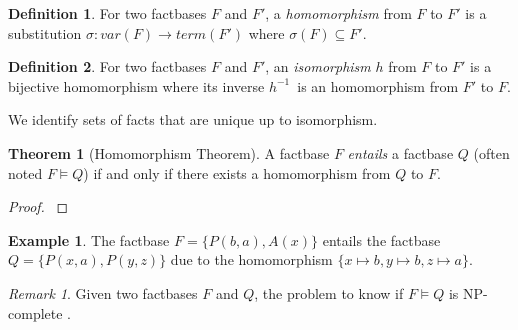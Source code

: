 \documentclass{article}
\theoremstyle{definition}
\newtheorem{definition}{Definition}[section]
\newtheorem{theorem}{Theorem}[section]
\newtheorem{example}{Example}[section]
\theoremstyle{remark}
\newtheorem{remark}{Remark}[section]
\begin{document}
\begin{definition}
For two factbases $F$ and $F'$, a \emph{homomorphism} from $F$ to $F'$ is a substitution $\sigma:var(F) \to term(F')$ where $\sigma(F) \subseteq F'$.
\end{definition}

\begin{definition}
For two factbases $F$ and $F'$, an \emph{isomorphism} $h$ from $F$ to $F'$ is a bijective homomorphism where its inverse $h^{-1}$\ is an homomorphism from $F'$ to $F$. 
\end{definition}

We identify sets of facts that are unique up to isomorphism.


\begin{theorem}[Homomorphism Theorem]
A factbase $F$ \emph{entails} a factbase $Q$ (often noted $F \models Q$) if and only if there exists a homomorphism from $Q$ to $F$.
\end{theorem}

\begin{proof}
\cite{base}
\end{proof}

\begin{example}
The factbase $F = \{P(b,a),A(x)\}$ entails the factbase $Q = \{P(x,a),P(y,z)\}$ due to the homomorphism $\{x \mapsto b, y \mapsto b, z \mapsto a \}$.
\end{example}

\begin{remark}
Given two factbases $F$ and $Q$, the problem to know if $F \models Q$ is NP-complete \cite{NP}. 
\end{remark}
\end{document}
